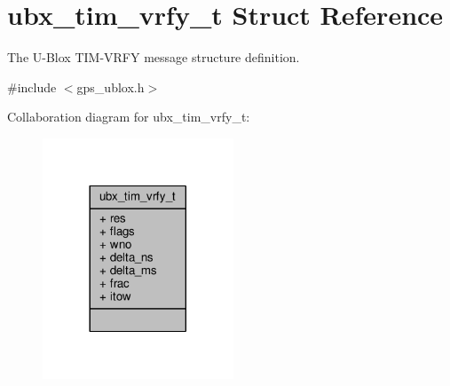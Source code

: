 \hypertarget{structubx__tim__vrfy__t}{\section{ubx\+\_\+tim\+\_\+vrfy\+\_\+t Struct Reference}
\label{structubx__tim__vrfy__t}
}


The U-\/\+Blox T\+I\+M-\/\+V\+R\+F\+Y message structure definition.  




{\ttfamily \#include $<$gps\+\_\+ublox.\+h$>$}



Collaboration diagram for ubx\+\_\+tim\+\_\+vrfy\+\_\+t\+:
\nopagebreak
\begin{figure}[H]
\begin{center}
\leavevmode
\includegraphics[width=161pt]{structubx__tim__vrfy__t__coll__graph}
\end{center}
\end{figure}
